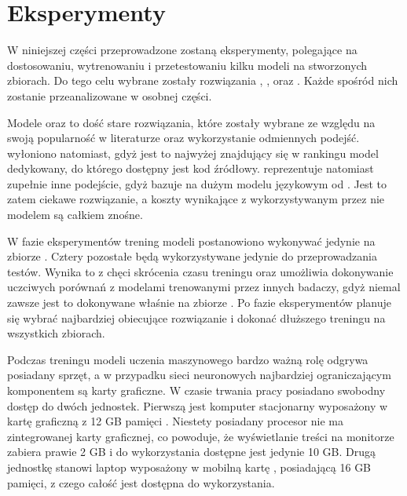 \chapter{Eksperymenty}

W niniejszej części przeprowadzone zostaną eksperymenty, polegające na dostosowaniu, wytrenowaniu i przetestowaniu kilku modeli na stworzonych zbiorach. Do tego celu wybrane zostały rozwiązania , ,  oraz . Każde spośród nich zostanie przeanalizowane w osobnej części. 

Modele  oraz  to dość stare rozwiązania, które zostały wybrane ze względu na swoją popularność w literaturze oraz wykorzystanie odmiennych podejść.  wyłoniono natomiast, gdyż jest to najwyżej znajdujący się w rankingu  model dedykowany, do którego dostępny jest kod źródłowy.  reprezentuje natomiast zupełnie inne podejście, gdyż bazuje na dużym modelu językowym od . Jest to zatem ciekawe rozwiązanie, a koszty wynikające z wykorzystywanym przez nie modelem  są całkiem znośne.

W fazie eksperymentów trening modeli postanowiono wykonywać jedynie na zbiorze . Cztery pozostałe będą wykorzystywane jedynie do przeprowadzania testów. Wynika to z chęci skrócenia czasu treningu oraz umożliwia dokonywanie uczciwych porównań z modelami trenowanymi przez innych badaczy, gdyż niemal zawsze jest to dokonywane właśnie na zbiorze . Po fazie eksperymentów planuje się wybrać najbardziej obiecujące rozwiązanie i dokonać dłuższego treningu na wszystkich zbiorach.

Podczas treningu modeli uczenia maszynowego bardzo ważną rolę odgrywa posiadany sprzęt, a w przypadku sieci neuronowych najbardziej ograniczającym komponentem są karty graficzne. W czasie trwania pracy posiadano swobodny dostęp do dwóch jednostek. Pierwszą jest komputer stacjonarny wyposażony w kartę graficzną  z 12 GB pamięci . Niestety posiadany procesor nie ma zintegrowanej karty graficznej, co powoduje, że wyświetlanie treści na monitorze zabiera prawie 2 GB i do wykorzystania dostępne jest jedynie 10 GB. Drugą jednostkę stanowi laptop  wyposażony w mobilną kartę , posiadającą 16 GB pamięci, z czego całość jest dostępna do wykorzystania.










